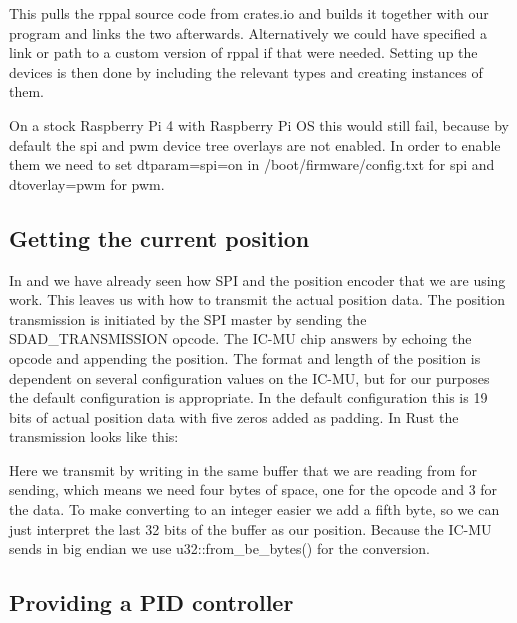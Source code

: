 

This pulls the rppal source code from crates.io and builds it together with our program and links the two afterwards.
Alternatively we could have specified a link or path to a custom version of rppal if that were needed.
Setting up the devices is then done by including the relevant types and creating instances of them.



On a stock Raspberry Pi 4 with Raspberry Pi OS this would still fail, because by default the spi and pwm device tree overlays are not enabled.
In order to enable them we need to set dtparam=spi=on in /boot/firmware/config.txt for spi and dtoverlay=pwm for pwm.

\subsection{Getting the current position}

In  and  we have already seen how SPI and the position encoder that we are using work.
This leaves us with how to transmit the actual position data.
The position transmission is initiated by the SPI master by sending the SDAD\_TRANSMISSION opcode.
The IC-MU chip answers by echoing the opcode and appending the position.
The format and length of the position is dependent on several configuration values on the IC-MU, but for our purposes the default configuration is appropriate.
In the default configuration this is 19 bits of actual position data with five zeros added as padding.
In Rust the transmission looks like this:



Here we transmit by writing in the same buffer that we are reading from for sending, which means we need four bytes of space, one for the opcode and 3 for the data.
To make converting to an integer easier we add a fifth byte, so we can just interpret the last 32 bits of the buffer as our position.
Because the IC-MU sends in big endian we use u32::from\_be\_bytes() for the conversion.

\subsection{Providing a PID controller}

